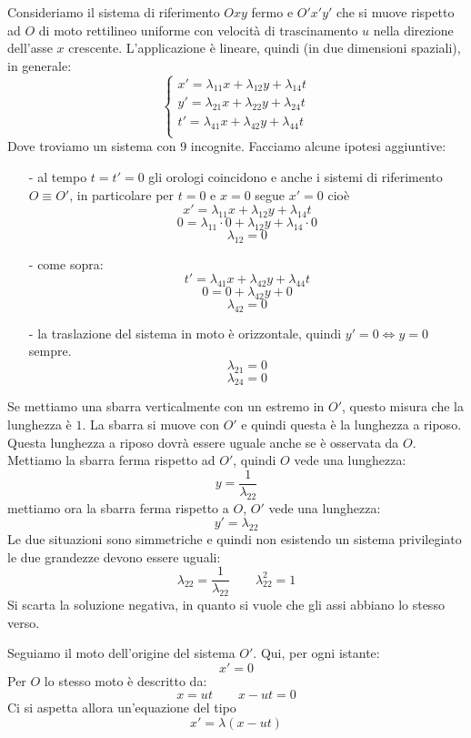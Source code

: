 Consideriamo il sistema di riferimento $Oxy$ fermo e $O'x'y'$ che si muove rispetto ad $O$ di moto rettilineo 
uniforme con velocità di trascinamento $u$ nella direzione dell'asse $x$ crescente. L'applicazione è lineare, 
quindi (in due dimensioni spaziali), in generale:
\[\left\{
\begin{array}{l}
x'=\lambda_{11}x+\lambda_{12}y+\lambda_{14}t\\
y'=\lambda_{21}x+\lambda_{22}y+\lambda_{24}t\\
t'=\lambda_{41}x+\lambda_{42}y+\lambda_{44}t\\\end{array}\right.
\]
Dove troviamo un sistema con 9 incognite. Facciamo alcune ipotesi aggiuntive:
\begin{itemize}
\item[-] al tempo $t=t'=0$ gli orologi coincidono e anche i sistemi di riferimento $O\equiv O'$, in particolare per $t=0$ e $x=0$ segue $x'=0$ cioè
\[x'=\lambda_{11}x+\lambda_{12}y+\lambda_{14}t\]
\[0=\lambda_{11}\cdot 0+\lambda_{12}y+\lambda_{14}\cdot 0\]
\[\lambda_{12}=0\]
\item[-] come sopra:
\[t'=\lambda_{41}x+\lambda_{42}y+\lambda_{44}t\]
\[0=0+\lambda_{42}y+0\]
\[\lambda_{42}=0\]
\item[-] la traslazione del sistema in moto è orizzontale, quindi $y'=0\Leftrightarrow y=0$ sempre.
\[\lambda_{21}=0\]
\[\lambda_{24}=0\]

\end{itemize}

Se mettiamo una sbarra verticalmente con un estremo in $O'$, questo misura che la lunghezza è $1$. 
La sbarra si muove con $O'$ e quindi questa è la lunghezza a riposo. Questa lunghezza a riposo dovrà essere uguale anche se è osservata da $O$. Mettiamo la sbarra ferma rispetto ad $O'$, quindi $O$ vede una lunghezza:
\[y=\frac{1}{\lambda_{22}}\]
mettiamo ora la sbarra ferma rispetto a $O$, $O'$ vede una lunghezza:
\[y'=\lambda_{22}\]
Le due situazioni sono simmetriche e quindi non esistendo un sistema privilegiato le due grandezze devono essere uguali:
\[\lambda_{22}=\frac{1}{\lambda_{22}}\qquad\lambda^2_{22}=1\]
Si scarta la soluzione negativa, in quanto si vuole che gli assi abbiano lo stesso verso.

\parbox[]{\textwidth}{
Seguiamo il moto dell'origine del sistema $O'$. Qui, per ogni istante:
\[x'=0\]
Per $O$ lo stesso moto è descritto da:
\[x=ut\qquad x-ut=0\]
Ci si aspetta allora un'equazione del tipo
\[x'=\lambda(x-ut)\]
}

